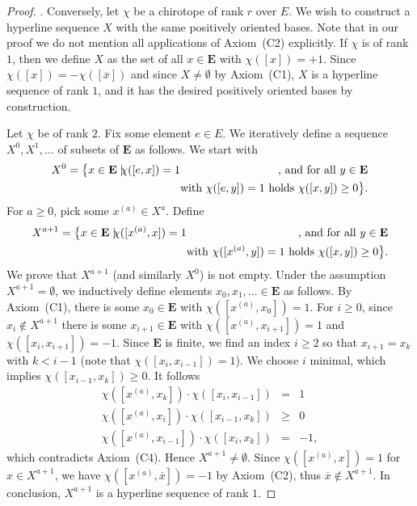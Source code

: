 \documentclass[a4paper]{amsart}
\theoremstyle{definition}
\theoremstyle{remark}
\begin{document}
\begin{proof}
.  Conversely, let $\chi$ be a chirotope of rank $r$ over $E$. We
wish to construct a hyperline sequence $X$ with the same positively
oriented bases. Note that in our proof we do not mention all
applications of Axiom~(C2) explicitly.  If $\chi$ is of rank $1$, then
we define $X$ as the set of all $x\in \mathbf E$ with $\chi([x]) =
+1$.  Since $\chi([x]) = -\chi([\overline x])$ and since
$X\not=\emptyset$ by Axiom~(C1), $X$ is a hyperline sequence of rank
$1$, and it has the desired positively oriented bases by construction.
  
Let $\chi$ be of rank $2$. 
Fix some element $e\in E$.  We iteratively
define a sequence $X^0,X^1,\ldots$ of subsets of $\mathbf E$ as
follows.
%
We start with
  \begin{eqnarray*}
    X^{0} = \big\{ x\in \mathbf E \;|\; &\hspace{-.5em}\chi([e,x])=1&
    \text{\hspace{-1em}, and 
    for all } y\in \mathbf E\\
      &&  \text{\hspace{-1em}with }\chi([e,y]) = 1\text{ holds } 
      \chi([x,y]) \ge 0\big\}. 
  \end{eqnarray*}
%
  For $a\ge 0$, pick some $x^{(a)}\in X^a$.  Define
  \begin{eqnarray*}
    X^{a+1}=
    \big\{ x\in \mathbf E \;|\; &\hspace{-.5em}\chi([x^{(a)},x])=1& \text{\hspace{-1em}, and
    for all } y\in \mathbf E\\
    && \text{\hspace{-1em}with }\chi([x^{(a)},y]) = 1\text{
    holds } \chi([x,y]) \ge 0\big\}. 
  \end{eqnarray*}
  We prove that $X^{a+1}$ (and similarly $X^0$) is not empty.  
  Under the assumption $X^{a+1}=\emptyset$, we inductively define 
  elements $x_0,x_1,\ldots\in \mathbf E$ as follows. 
%
  By Axiom~(C1), there is some $x_0\in \mathbf E$ with
  $\chi([x^{(a)},x_0])=1$.  For $i\ge 0$,
  since $x_i\not\in X^{a+1}$ there is some $x_{i+1}\in \mathbf E$ with
  $\chi([x^{(a)},x_{i+1}])=1$ and $\chi([x_i,x_{i+1}])=-1$.
%
  Since $\mathbf E$ is finite, we find an index $i\ge 2$ so that
  $x_{i+1}=x_k$ with $k<i-1$ (note that $\chi([x_i,x_{i-1}])=1$).
  We choose $i$  minimal, which implies $\chi([x_{i-1},x_k])\ge 0$.
  It follows
  \begin{eqnarray*}
    \chi([x^{(a)},x_k])\cdot \chi([x_i,x_{i-1}]) &=&1 \\
    \chi([x^{(a)},x_i])\cdot \chi([x_{i-1},x_k]) &\ge&0 \\
    \chi([x^{(a)},x_{i-1}])\cdot \chi([x_i,x_k]) &=&-1, 
  \end{eqnarray*}
  which contradicts Axiom~(C4).
  Hence $X^{a+1}\not=\emptyset$.
%
 Since $\chi([x^{(a)},x])=1$ for $x\in X^{a+1}$, we have
  $\chi([x^{(a)},\overline x])=-1$ by Axiom~(C2), thus $\overline
  x\not\in X^{a+1}$.
  In conclusion, $X^{a+1}$ is a hyperline sequence of rank $1$.
  

\end{proof}
\end{document}
